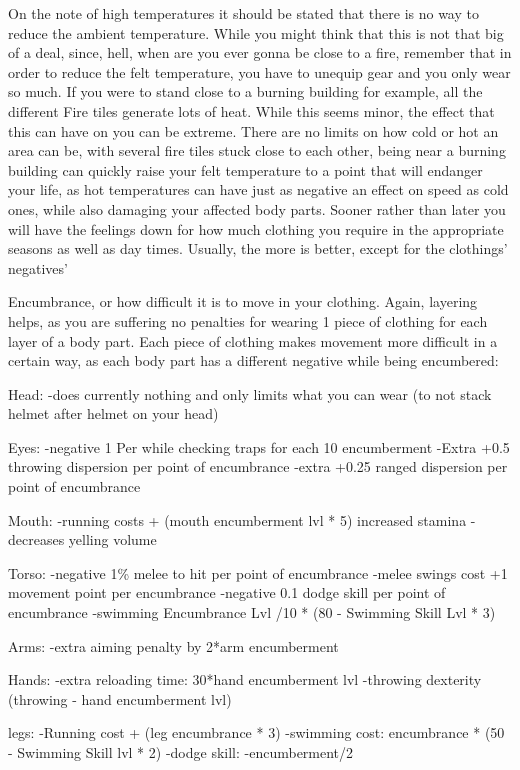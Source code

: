 \documentclass[11pt]{report}
\begin{document}
On the note of high temperatures it should be stated that there is no way to reduce the ambient temperature. While you might think that this is not that big of a deal, since, hell, when are you ever gonna be close to a fire, remember that in order to reduce the felt temperature, you have to unequip gear and you only wear so much. If you were to stand close to a burning building for example, all the different Fire tiles generate lots of heat. While this seems minor, the effect that this can have on you can be extreme. There are no limits on how cold or hot an area can be, with several fire tiles stuck close to each other, being near a burning building can quickly raise your felt temperature to a point that will endanger your life, as hot temperatures can have just as negative an effect on speed as cold ones, while also damaging your affected body parts. Sooner rather than later you will have the feelings down for how much clothing you require in the appropriate seasons as well as day times. Usually, the more is better, except for the clothings' negatives'

Encumbrance, or how difficult it is to move in your clothing. Again, layering helps, as you are suffering no penalties for wearing 1 piece of clothing for each layer of a body part. Each piece of clothing makes movement more difficult in a certain way, as each body part has a different negative while being encumbered:

Head:
-does currently nothing and only limits what you can wear (to not stack helmet after helmet on your head)

Eyes:
-negative 1 Per while checking traps for each 10 encumberment
-Extra +0.5 throwing dispersion per point of encumbrance
-extra +0.25 ranged dispersion per point of encumbrance

Mouth:
-running costs + (mouth encumberment lvl * 5) increased stamina
-decreases yelling volume

Torso:
-negative 1\% melee to hit per point of encumbrance
-melee swings cost +1 movement point per encumbrance
-negative 0.1 dodge skill per point of encumbrance
-swimming Encumbrance Lvl /10 * (80 - Swimming Skill Lvl * 3)

Arms:
-extra aiming penalty by 2*arm encumberment

Hands:
-extra reloading time: 30*hand encumberment lvl
-throwing dexterity (throwing - hand encumberment lvl)

legs:
-Running cost + (leg encumbrance * 3)
-swimming cost: encumbrance * (50 - Swimming Skill lvl * 2)
-dodge skill: -encumberment/2
\end{document}
